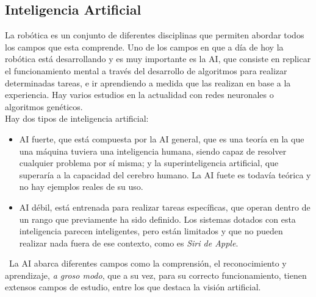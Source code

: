 \subsection{Inteligencia Artificial}
La robótica es un conjunto de diferentes disciplinas que permiten abordar todos los campos que esta comprende. Uno de los campos en que a día de hoy la robótica está desarrollando y es muy importante es la AI, que consiste en replicar el funcionamiento mental a través del desarrollo de algoritmos para realizar determinadas tareas, e ir aprendiendo a medida que las realizan en base a la experiencia. Hay varios estudios en la actualidad con redes neuronales o algoritmos genéticos.\\
Hay dos tipos de inteligencia artificial:
\begin{itemize}
 \item{AI fuerte,} que está compuesta por la AI general, que es una teoría en la que una máquina tuviera una inteligencia humana, siendo capaz de resolver cualquier problema por sí misma; y la superinteligencia artificial, que superaría a la capacidad del cerebro humano. La AI fuete es todavía teórica y no hay ejemplos reales de su uso.
  \item{AI débil,} está entrenada para realizar tareas específicas, que operan dentro de un rango que previamente ha sido definido. Los sistemas dotados con esta inteligencia parecen inteligentes, pero están limitados y que no pueden realizar nada fuera de ese contexto, como es \textit{Siri de Apple}.
\end{itemize}\
La AI abarca diferentes campos como la comprensión, el reconocimiento y aprendizaje, \textit{a groso modo}, que a su vez, para su correcto funcionamiento, tienen extensos campos de estudio, entre los que destaca la visión artificial.\\


